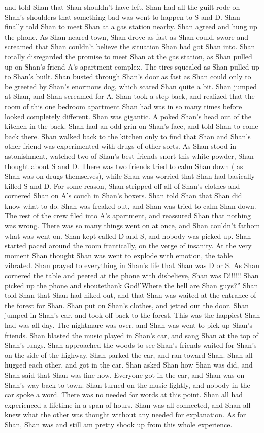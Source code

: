 \documentclass[12pt]{book}
\begin{document}
and told Shan that Shan shouldn't have left, Shan had all the guilt rode on Shan's shoulders that something bad was went to happen to S and D. Shan finally told Shan to meet Shan at a gas station nearby. Shan agreed and hung up the phone. As Shan neared town, Shan drove as fast as Shan could, swore and screamed that Shan couldn't believe the situation Shan had got Shan into. Shan totally disregarded the promise to meet Shan at the gas station, as Shan pulled up on Shan's friend A's apartment complex. The tires squealed as Shan pulled up to Shan's built. Shan busted through Shan's door as fast as Shan could only to be greeted by Shan's enormous dog, which scared Shan quite a bit. Shan jumped at Shan, and Shan screamed for A. Shan took a step back, and realized that the room of this one bedroom apartment Shan had was in so many times before looked completely different. Shan was gigantic. A poked Shan's head out of the kitchen in the back. Shan had an odd grin on Shan's face, and told Shan to come back there. Shan walked back to the kitchen only to find that Shan and Shan's other friend was experimented with drugs of other sorts. As Shan stood in astonishment, watched two of Shan's best friends snort this white powder, Shan thought about S and D. There was two friends tried to calm Shan down ( as Shan was on drugs themselves), while Shan was worried that Shan had basically killed S and D. For some reason, Shan stripped off all of Shan's clothes and cornered Shan on A's couch in Shan's boxers. Shan told Shan that Shan did know what to do. Shan was freaked out, and Shan was tried to calm Shan down. The rest of the crew filed into A's apartment, and reassured Shan that nothing was wrong. There was so many things went on at once, and Shan couldn't fathom what was went on. Shan kept called D and S, and nobody was picked up. Shan started paced around the room frantically, on the verge of insanity. At the very moment Shan thought Shan was went to explode with emotion, the table vibrated. Shan prayed to everything in Shan's life that Shan was D or S. As Shan cornered the table and peered at the phone with disbelieve, Shan was D!!!!!! Shan picked up the phone and shoutethank God!'Where the hell are Shan guys?'' Shan told Shan that Shan had hiked out, and that Shan was waited at the entrance of the forest for Shan. Shan put on Shan's clothes, and jetted out the door. Shan jumped in Shan's car, and took off back to the forest. This was the happiest Shan had was all day. The nightmare was over, and Shan was went to pick up Shan's friends. Shan blasted the music played in Shan's car, and sang Shan at the top of Shan's lungs. Shan approached the woods to see Shan's friends waited for Shan's on the side of the highway. Shan parked the car, and ran toward Shan. Shan all hugged each other, and got in the car. Shan asked Shan how Shan was did, and Shan said that Shan was fine now. Everyone got in the car, and Shan was on Shan's way back to town. Shan turned on the music lightly, and nobody in the car spoke a word. There was no needed for words at this point. Shan all had experienced a lifetime in a span of hours. Shan was all connected, and Shan all knew what the other was thought without any needed for explanation. As for Shan, Shan was and still am pretty shook up from this whole experience. 
\end{document}
